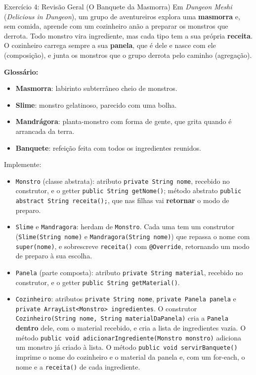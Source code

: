 \begin{exercicio}{Exercício 4: Revisão Geral (O Banquete da Masmorra)}
Em \textit{Dungeon Meshi} (\textit{Delicious in Dungeon}), um grupo de aventureiros explora uma
\textbf{masmorra} e, sem comida, aprende com um cozinheiro anão a preparar os monstros que
derrota. Todo monstro vira ingrediente, mas cada tipo tem a sua própria \textbf{receita}. O
cozinheiro carrega sempre a sua \textbf{panela}, que é dele e nasce com ele (composição), e
junta os monstros que o grupo derrota pelo caminho (agregação).

\textbf{Glossário:}
\begin{itemize}
    \item \textbf{Masmorra}: labirinto subterrâneo cheio de monstros.
    \item \textbf{Slime}: monstro gelatinoso, parecido com uma bolha.
    \item \textbf{Mandrágora}: planta-monstro com forma de gente, que grita quando é arrancada
    da terra.
    \item \textbf{Banquete}: refeição feita com todos os ingredientes reunidos.
\end{itemize}

Implemente:

\begin{itemize}
    \item \texttt{Monstro} (classe abstrata): atributo \texttt{private String nome}, recebido no
    construtor, e o getter \texttt{public String getNome()}; método abstrato
    \texttt{public abstract String receita();}, que nas filhas vai \textbf{retornar} o modo de
    preparo.

    \item \texttt{Slime} e \texttt{Mandragora}: herdam de \texttt{Monstro}. Cada uma tem um
    construtor (\texttt{Slime(String nome)} e \texttt{Mandragora(String nome)}) que repassa o
    nome com \texttt{super(nome)}, e sobrescreve
    \texttt{receita()} com \texttt{@Override}, retornando um modo de preparo à sua escolha.

    \item \texttt{Panela} (parte composta): atributo \texttt{private String material}, recebido
    no construtor, e o getter \texttt{public String getMaterial()}.

    \item \texttt{Cozinheiro}: atributos \texttt{private String nome},
    \texttt{private Panela panela} e \texttt{private ArrayList<Monstro> ingredientes}. O
    construtor \texttt{Cozinheiro(String nome, String materialDaPanela)} cria a \texttt{Panela}
    \textbf{dentro} dele, com o material recebido, e cria a lista de ingredientes vazia. O
    método \texttt{public void adicionarIngrediente(Monstro monstro)} adiciona um monstro já
    criado à lista. O método \texttt{public void servirBanquete()} imprime o nome do cozinheiro
    e o material da panela e, com um for-each, o nome e a \texttt{receita()} de cada
    ingrediente.
\end{itemize}


\end{exercicio}
